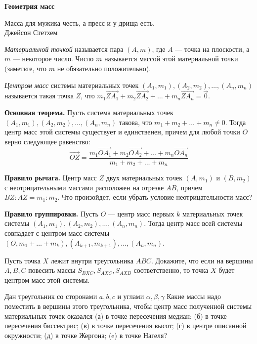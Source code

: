\centerline{\bf \Huge Геометрия масс}

\begin{flushright}
        \scriptsize{Масса для мужика честь, а пресс и у дрища есть. \\ Джейсон Стетхем}
\end{flushright}

\textit{Материальной точкой} называется пара $(A, m)$, где $A$ --- точка на плоскости, а $m$ --- некоторое число. Число $m$ называется массой этой материальной точки (заметьте, что $m$ не обязательно положительно).

\textit{Центром масс} системы материальных точек $(A_1, m_1), (A_2, m_2), \ldots, (A_n, m_n)$ называется такая точка $Z$, что $m_1 \overrightarrow{ZA_1} + m_2 \overrightarrow{ZA_2} + \ldots + m_n \overrightarrow{ZA_n} = \overrightarrow{0}$.

\textbf{Основная теорема.} Пусть система материальных точек $(A_1, m_1), (A_2, m_2), \ldots, (A_n, m_n)$ такова, что $m_1 + m_2 + \ldots + m_n \neq 0$. Тогда центр масс этой системы существует и единственен, причем для любой точки $O$ верно следующее равенство:
\[
\overrightarrow{OZ} = \frac{m_1 \overrightarrow{OA_1} + m_2 \overrightarrow{OA_2} + \dots + m_n \overrightarrow{OA_n}}{m_1 + m_2 + \ldots + m_n}
\]

\textbf{Правило рычага.} Центр масс $Z$ двух материальных точек $(A, m_1)$ и $(B, m_2)$ с неотрицательными массами расположен на отрезке $AB$, причем $BZ : AZ = m_1 : m_2$. Что произойдет, если убрать условие неотрицательности масс?

\textbf{Правило группировки.} Пусть $O$ --- центр масс первых $k$ материальных точек системы $(A_1, m_1), (A_2, m_2), \ldots, (A_n, m_n)$. Тогда центр масс всей системы совпадает с центром масс системы $(O, m_1 + \ldots + m_k), (A_{k+1}, m_{k+1}), \ldots, (A_n, m_n)$.

Пусть точка $X$ лежит внутри треугольника $ABC.$ Докажите, что если на вершины $A, B, C$ повесить массы $S_{BXC}, S_{AXC}, S_{AXB}$ соответственно, то точка $X$ будет центром масс этой системы.

Дан треугольник со сторонами $a, b, c$ и углами $\alpha, \beta, \gamma$ Какие массы надо поместить в вершины этого треугольника, чтобы центр масс полученной системы материальных точек оказался (а) в точке пересечения медиан; (б) в точке пересечения биссектрис; (в) в точке пересечения высот; (г) в центре описанной окружности; (д) в точке Жергона; (e) в точке Нагеля?

